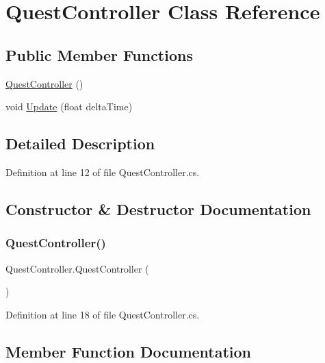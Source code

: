 \hypertarget{class_quest_controller}{}\section{Quest\+Controller Class Reference}
\label{class_quest_controller}
\subsection*{Public Member Functions}
\begin{DoxyCompactItemize}
\item 
\hyperlink{class_quest_controller_a7bedf7a40cd13eaf8e0d9e81483b2a07}{Quest\+Controller} ()
\item 
void \hyperlink{class_quest_controller_a161ac6f98798a65b5bbc5bf06da32cf9}{Update} (float delta\+Time)
\end{DoxyCompactItemize}


\subsection{Detailed Description}


Definition at line 12 of file Quest\+Controller.\+cs.



\subsection{Constructor \& Destructor Documentation}
\mbox{\label{class_quest_controller_a7bedf7a40cd13eaf8e0d9e81483b2a07}} 
\subsubsection{\texorpdfstring{Quest\+Controller()}{QuestController()}}
{\footnotesize\ttfamily Quest\+Controller.\+Quest\+Controller (\begin{DoxyParamCaption}{ }\end{DoxyParamCaption})}



Definition at line 18 of file Quest\+Controller.\+cs.



\subsection{Member Function Documentation}
\mbox{\label{class_quest_controller_a161ac6f98798a65b5bbc5bf06da32cf9}} 
